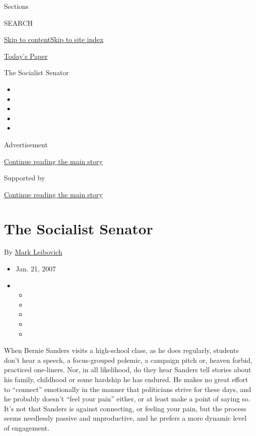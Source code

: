 Sections

SEARCH

\protect\hyperlink{site-content}{Skip to
content}\protect\hyperlink{site-index}{Skip to site index}

\href{https://myaccount.nytimes3xbfgragh.onion/auth/login?response_type=cookie\&client_id=vi}{}

\href{https://www.nytimes3xbfgragh.onion/section/todayspaper}{Today's
Paper}

The Socialist Senator

\begin{itemize}
\item
\item
\item
\item
\item
\end{itemize}

Advertisement

\protect\hyperlink{after-top}{Continue reading the main story}

Supported by

\protect\hyperlink{after-sponsor}{Continue reading the main story}

\hypertarget{the-socialist-senator}{%
\section{The Socialist Senator}\label{the-socialist-senator}}

By \href{https://www.nytimes3xbfgragh.onion/by/mark-leibovich}{Mark
Leibovich}

\begin{itemize}
\item
  Jan. 21, 2007
\item
  \begin{itemize}
  \item
  \item
  \item
  \item
  \item
  \end{itemize}
\end{itemize}

When Bernie Sanders visits a high-school class, as he does regularly,
students don't hear a speech, a focus-grouped polemic, a campaign pitch
or, heaven forbid, practiced one-liners. Nor, in all likelihood, do they
hear Sanders tell stories about his family, childhood or some hardship
he has endured. He makes no great effort to ``connect'' emotionally in
the manner that politicians strive for these days, and he probably
doesn't ``feel your pain'' either, or at least make a point of saying
so. It's not that Sanders is against connecting, or feeling your pain,
but the process seems needlessly passive and unproductive, and he
prefers a more dynamic level of engagement.

